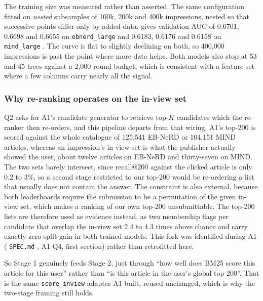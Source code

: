 \documentclass[11pt]{article}
\newcommand{\code}[1]{%
    \colorbox{gray!40}{\texttt{#1}}%
}
\begin{document}
The training size was measured rather than asserted. The same configuration
fitted on \emph{nested} subsamples of 100k, 200k and 400k impressions, nested
so that successive points differ only by added data, gives validation AUC of
0.6701, 0.6698 and 0.6655 on \code{ebnerd\_large} and 0.6183, 0.6176 and
0.6158 on \code{mind\_large}. The curve is flat to slightly declining on both,
so 400,000 impressions is past the point where more data helps. Both models
also stop at 53 and 45 trees against a 2,000-round budget, which is consistent
with a feature set where a few columns carry nearly all the signal.

\subsubsection*{Why re-ranking operates on the in-view set}
\label{sec:candidate-fork}

Q2 asks for A1's candidate generator to retrieve top-$K$ candidates which the
re-ranker then re-orders, and this pipeline departs from that wiring. A1's
top-200 is scored against the whole catalogue of 125,541 EB-NeRD or 104,151
MIND articles, whereas an impression's in-view set is what the publisher
actually showed the user, about twelve articles on EB-NeRD and thirty-seven on
MIND. The two sets barely intersect, since recall@200 against the clicked
article is only 0.2 to 3\%, so a second stage restricted to our top-200 would
be re-ordering a list that usually does not contain the answer. The constraint
is also external, because both leaderboards require the submission to be a
permutation of the given in-view set, which makes a ranking of our own top-200
unsubmittable. The top-200 lists are therefore used as evidence instead, as
two membership flags per candidate that overlap the in-view set 2.4 to 4.3
times above chance and carry exactly zero split gain in both trained models.
This fork was identified during A1 (\code{SPEC.md}, A1 Q4, first section) rather than
retrofitted here.

So Stage 1 genuinely feeds Stage 2, just through ``how well does BM25 score
this article for this user'' rather than ``is this article in the user's global
top-200''. That is the same \code{score\_inview} adapter A1 built, reused
unchanged, which is why the two-stage framing still holds.
\end{document}
